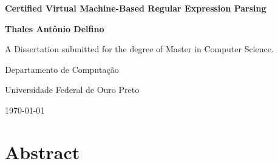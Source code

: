 \documentclass[oneside,12pt]{scrbook}
\theoremstyle{definition}
\theoremstyle{plain}
\theoremstyle{definition}
\begin{document}
\begin{titlepage}
\centering
\vspace*{1in}
\begin{Large}\bfseries
Certified Virtual Machine-Based Regular Expression Parsing \par
\end{Large}
\vspace{1.5in}
\begin{large}\bfseries
Thales Antônio Delfino\par
\end{large}
\vfill
A Dissertation submitted for the degree of Master in Computer Science.
\par
\vspace{0.5in}
Departamento de Computação
\par
Universidade Federal de Ouro Preto
\par
\vspace{0.5in}
\today
\par
\end{titlepage}


\frontmatter
\tableofcontents


\chapter{Abstract}\label{chapter:abstract}

\end{document}
